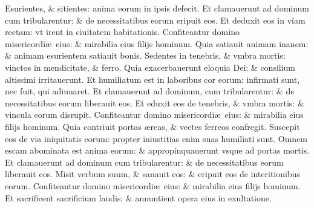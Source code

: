 \documentclass[a5paper,10pt]{book}
\def\ae{æ}
\begin{document}
\begin{multicols*}{2}
\newline \color{red} E\color{black}surientes, \& sitientes: anima eorum in ipsis defecit.
\newline \color{red} E\color{black}t clamauerunt ad dominum cum tribularentur: \& de necessitatibus eorum eripuit eos.
\newline \color{red} E\color{black}t deduxit eos in viam rectam: vt irent in ciuitatem habitationis.
\newline \color{red} C\color{black}onfiteantur domino misericordi\ae \ eius: \& mirabilia eius filijs hominum.
\newline \color{red} Q\color{black}uia satiauit animam inanem: \& animam esurientem satiauit bonis.
\newline \color{red} S\color{black}edentes in tenebris, \& vmbra mortis: vinctos in mendicitate, \& ferro.
\newline \color{red} Q\color{black}uia exacerbauerunt eloquia Dei: \& consilium altissimi irritauerunt.
\newline \color{red} E\color{black}t humiliatum est in laboribus cor eorum: infirmati sunt, nec fuit, qui adiuuaret.
\newline \color{red} E\color{black}t clamauerunt ad dominum, cum tribularentur: \& de necessitatibus eorum liberauit eos.
\newline \color{red} E\color{black}t eduxit eos de tenebris, \& vmbra mortis: \& vincula eorum disrupit.
\newline \color{red} C\color{black}onfiteantur domino misericordi\ae \ eius: \& mirabilia eius filijs hominum.
\newline \color{red} Q\color{black}uia contriuit portas \ae reas, \& vectes ferreos confregit.
\newline \color{red} S\color{black}uscepit eos de via iniquitatis eorum: propter iniustitias enim suas humiliati sunt.
\newline \color{red} O\color{black}mnem escam abominata est anima eorum: \& appropinquauerunt vsque ad portas mortis.
\newline \color{red} E\color{black}t clamauerunt ad dominum cum tribularentur: \& de necessitatibus eorum liberauit eos.
\newline \color{red} M\color{black}isit verbum suum, \& sanauit eos: \& eripuit eos de interitionibus eorum.
\newline \color{red} C\color{black}onfiteantur domino misericordi\ae \ eius: \& mirabilia eius filijs hominum.
\newline \color{red} E\color{black}t sacrificent sacrificium laudis: \& annuntient opera eius in exultatione.

\end{multicols*}
\end{document}
